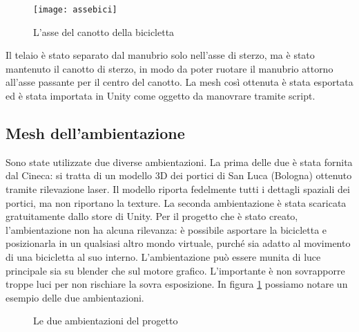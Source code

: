 \begin{wrapfigure}{r}{0.35\textwidth} %
    \centering
    \vspace{-1.3cm}
    \texttt{[image: assebici]}
    \caption{L'asse del canotto della bicicletta}
    \vspace{-1.3cm}
\end{wrapfigure}
\noindent Il telaio è stato separato dal manubrio solo nell'asse di sterzo, ma è stato mantenuto il canotto di sterzo, in modo da poter ruotare il manubrio attorno all'asse passante per il centro del canotto. La mesh così ottenuta è stata esportata ed è stata importata in Unity come oggetto da manovrare tramite script.\\
\subsection{Mesh dell'ambientazione}
\label{ambientazione}
\noindent Sono state utilizzate due diverse ambientazioni. La prima delle due è stata fornita dal Cineca: si tratta di un modello 3D dei portici di San Luca (Bologna) ottenuto tramite rilevazione laser. Il modello riporta fedelmente tutti i dettagli spaziali dei portici, ma non riportano la texture. La seconda ambientazione è stata scaricata gratuitamente dallo store di Unity. Per il progetto che è stato creato, l'ambientazione non ha alcuna rilevanza: è possibile asportare la bicicletta e posizionarla in un qualsiasi altro mondo virtuale, purché sia adatto al movimento di una bicicletta al suo interno. L'ambientazione può essere munita di luce principale sia su blender che sul motore grafico. L'importante è non sovrapporre troppe luci per non rischiare la sovra esposizione. In figura \ref{ambientazione} possiamo notare un esempio delle due ambientazioni.
\vspace{-0.5cm}
\begin{figure}[hbp]%
    \centering
    \caption{Le due ambientazioni del progetto}%
    \label{ambientazione}
\end{figure}
\vspace{-0.5cm}

